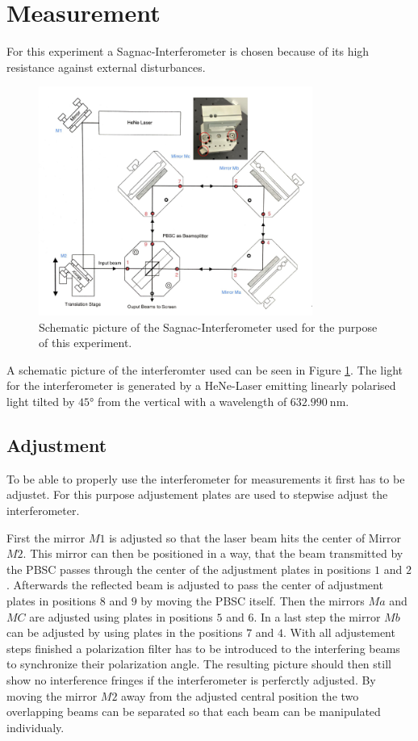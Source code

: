 \section{Measurement}
\label{sec:Durchführung}
For this experiment a Sagnac-Interferometer is chosen because of its high resistance against external disturbances.
\begin{figure}
\centering
\includegraphics[width=0.8\textwidth]{Sagnac-Interferometer}
\caption{Schematic picture of the Sagnac-Interferometer used for the purpose of this experiment. \cite{V64}}
\label{fig:Sagnac}
\end{figure}
A schematic picture of the interferomter used can be seen in Figure \ref{fig:Sagnac}. The light for the interferometer is generated by a HeNe-Laser emitting linearly polarised light tilted by $45°$ from the vertical with a wavelength of $\SI{632,990}{\nano\meter}$.
\subsection{Adjustment}
To be able to properly use the interferometer for measurements it first has to be adjustet. For this purpose adjustement plates are used to stepwise adjust the interferometer. 

First the mirror $M1$ is adjusted so that the laser beam hits the center of Mirror $M2$. This mirror can then be positioned in a way, that the beam transmitted by the PBSC passes through the center of the adjustment plates in positions $1$ and $2$. Afterwards the reflected beam is adjusted to pass the center of adjustment plates in positions $8$ and $9$ by moving the PBSC itself. Then the mirrors $Ma$ and $MC$ are adjusted using plates in positions $5$ and $6$. In a last step the mirror $Mb$ can be adjusted by using plates in the positions $7$ and $4$. With all adjustement steps finished a polarization filter has to be introduced to the interfering beams to synchronize their polarization angle. The resulting picture should then still show no interference fringes if the interferometer is perferctly adjusted. By moving the mirror $M2$ away from the adjusted central position the two overlapping beams can be separated so that each beam can be manipulated individualy.
